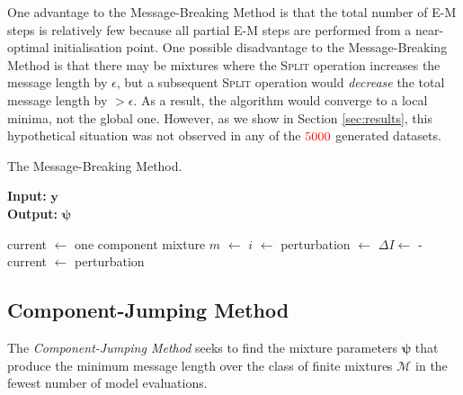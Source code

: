 \documentclass{elsarticle}
\newcommand{\todo}[1]{\textcolor{red}{#1}}
\newcommand{\vect}[1]{\boldsymbol{\mathbf{#1}}}
\renewcommand{\vec}[1]{\vect{#1}}
\def\datum{y}
\def\data{\vect{\datum}}
\begin{document}
One advantage to the Message-Breaking Method is that the total number of E-M steps is relatively few because all partial E-M steps are performed from a near-optimal initialisation point. One possible disadvantage to the Message-Breaking Method is that there may be mixtures where the \textsc{Split} operation increases the message length by $\epsilon$, but a subsequent \textsc{Split} operation would \emph{decrease} the total message length by $>\epsilon$. As a result, the algorithm would converge to a local minima, not the global one. However, as we show in Section \ref{sec:results}, this hypothetical situation was not observed in any of the $\todo{5000}$ generated datasets.

\begin{algorithm}[H]
\caption{The Message-Breaking Method.}
\label{alg:MBM}
{\bf Input:} $\vec{\data}$ \\
{\bf Output:} $\vec{\psi}$  
\begin{algorithmic}[1]
\State current $\leftarrow$ one component mixture
\State $m$ $\leftarrow$ 
\State $i$ $\leftarrow$  
\State perturbation $\leftarrow$  \label{line:mbm-split}
\State $\Delta{}I \leftarrow$  -  
 
\State current $\leftarrow$ perturbation
\EndIf
{} \label{line:end}
\EndWhile
\end{algorithmic}
\end{algorithm}


\subsection{Component-Jumping Method}

The \emph{Component-Jumping Method} seeks to find the mixture parameters $\vec\psi$ that produce the minimum message length over the class of finite mixtures $\vec{\mathcal{M}}$ in the fewest number of model evaluations.
\end{document}
